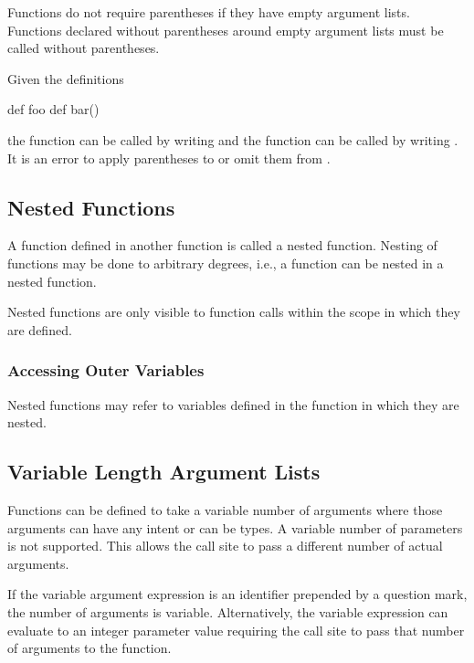 Functions do not require parentheses if they have empty argument
lists.  Functions declared without parentheses around empty argument
lists must be called without parentheses.

\begin{example}
Given the definitions
\begin{chapel}
def foo { }
def bar() { }
\end{chapel}
the function  can be called by writing  and the
function  can be called by writing .  It is an
error to apply parentheses to  or omit them from .
\end{example}

\subsection{Nested Functions}
\label{Nested_Functions}

A function defined in another function is called a nested function.
Nesting of functions may be done to arbitrary degrees, i.e., a
function can be nested in a nested function.

Nested functions are only visible to function calls within the scope
in which they are defined.

\subsubsection{Accessing Outer Variables}
\label{Accessing_Outer_Variables}

Nested functions may refer to variables defined in the function in
which they are nested.

\subsection{Variable Length Argument Lists}
\label{Variable_Length_Argument_Lists}

Functions can be defined to take a variable number of arguments where
those arguments can have any intent or can be types.  A variable
number of parameters is not supported.  This allows the call site to
pass a different number of actual arguments.

If the variable argument expression is an identifier prepended by a
question mark, the number of arguments is variable.  Alternatively,
the variable expression can evaluate to an integer parameter value
requiring the call site to pass that number of arguments to the
function.

